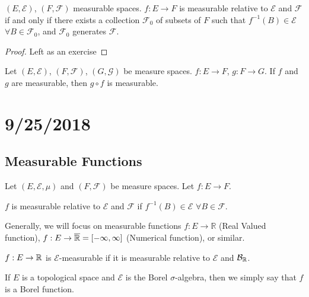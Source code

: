 \documentclass[english, course]{Notes}
\begin{document}
\begin{theorem}
	$(E, \mathcal{E})$, $(F, \mathcal{F})$ measurable spaces. $f: E \to F$ is measurable relative to $\mathcal{E}$ and $\mathcal{F}$ if and only if there exists a collection $\mathcal{F}_0$ of subsets of $F$ such that $f^{-1}(B) \in \mathcal{E}$ $\forall B \in \mathcal{F_0}$, and $\mathcal{F}_0$ generates $\mathcal{F}$.
\end{theorem}
\begin{proof}
	Left as an exercise
\end{proof}

\begin{theorem}
Let $(E, \mathcal{E})$, $(F, \mathcal{F})$, $(G, \mathcal{G})$ be measure spaces. $f: E \to F$, $g: F \to G$. If $f$ and $g$ are measurable, then $g \circ f$ is measurable.
\end{theorem}

\section{9/25/2018}

\subsection{Measurable Functions}

Let $(E, \mathcal{E}, \mu)$ and $(F, \mathcal{F})$ be measure spaces. Let $f: E \to F$.\\

\begin{definition}
$f$ is measurable relative to $\mathcal{E}$ and $\mathcal{F}$ if $f^{-1}(B) \in \mathcal{E}$ $\forall B \in \mathcal{F}$.\\
\end{definition}

Generally, we will focus on measurable functions $f: E \to \mathbb{R}$ (Real Valued function), $f: E \to \overline{\mathbb{R}} = [-\infty, \infty]$ (Numerical function), or similar.\\

\begin{definition}
$f: E \to \mathbb{R}$ is $\mathcal{E}$-measurable if it is measurable relative to $\mathcal{E}$ and $\mathcal{B}_{\mathbb{R}}$.\\
\end{definition}

\begin{definition}
If $E$ is a topological space and $\mathcal{E}$ is the Borel $\sigma$-algebra, then we simply say that $f$ is a Borel function.
\end{definition}
\end{document}
